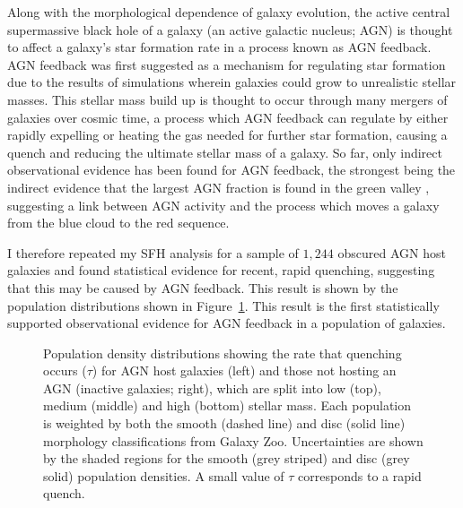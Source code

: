 \documentclass[12pt, usenatbib]{article}
\begin{document}
Along with the morphological dependence of galaxy evolution, the active central supermassive black hole of a galaxy (an active galactic nucleus; AGN) is thought to affect a galaxy's star formation rate in a process known as AGN feedback. AGN feedback was first suggested as a mechanism for regulating star formation due to the results of simulations wherein galaxies could grow to unrealistic stellar masses. This stellar mass build up is thought to occur through many mergers of galaxies over cosmic time, a process which AGN feedback can regulate by either rapidly expelling or heating the gas needed for further star formation, causing a quench and reducing the ultimate stellar mass of a galaxy. So far, only indirect observational evidence has been found for AGN feedback, the strongest being the indirect evidence that the largest AGN fraction is found in the green valley \citep{cowie08, hickox09, schawinski10}, suggesting a link between AGN activity and the process which moves a galaxy from the blue cloud to the red sequence.

I therefore repeated my SFH analysis for a sample of $1,244$ obscured AGN host galaxies and found statistical evidence for recent, rapid quenching, suggesting that this may be caused by AGN feedback. This result is shown by the population distributions shown in Figure~\ref{fig:agnfeedback}. This result is the first statistically supported observational evidence for AGN feedback in a population of galaxies. 

\begin{figure}[t]
\caption{Population density distributions showing the rate that quenching occurs ($\tau$) for AGN host galaxies (left) and those not hosting an AGN (inactive galaxies; right), which are split into low (top), medium (middle) and high (bottom) stellar mass. Each population is weighted by both the smooth (dashed line) and disc (solid line) morphology classifications from Galaxy Zoo. Uncertainties  are shown by the shaded regions for the smooth (grey striped) and disc (grey solid) population densities. A small value of $\tau$ corresponds to a rapid quench.}
\label{fig:agnfeedback}
\end{figure}
\end{document}
